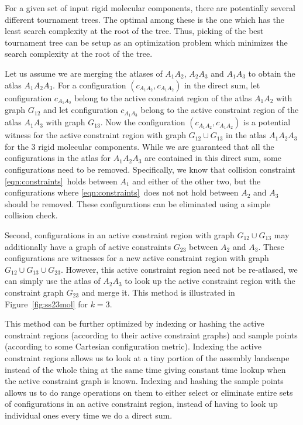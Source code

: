 \documentclass[]{article}
\newcommand{\figref}[1]{Figure~\ref{#1}}
\newcommand{\rmc}{rigid molecular component}
\newcommand{\cone}{\ref{eqn:constraints}}
\begin{document}
For a given set of input \rmc s, there are  potentially several different 
tournament trees. The optimal among these is the one which has the least
search complexity at the root of the tree. Thus, picking of the best
tournament tree can be setup as an optimization problem which minimizes
the search complexity at the root of the tree.

Let us assume we are merging the atlases of $A_1A_2$, $A_2A_3$ and $A_1A_3$ to
obtain the atlas $A_1A_2A_3$.  For a configuration $(c_{A_1A_2}, c_{A_1A_2})$
in the direct sum, let configuration $c_{A_1A_2}$ belong to the active
constraint region of the atlas $A_1A_2$ with graph $G_{12}$ and let
configuration $c_{A_1A_3}$ belong to the active constraint region of the atlas
$A_1A_3$ with graph $G_{13}$. Now the configuration $(c_{A_1A_2}, c_{A_1A_2})$
is a potential witness for the active constraint region with graph $G_{12}\cup
G_{13}$ in the atlas $A_1A_2A_3$ for the 3 \rmc s. While we are guaranteed that
all the configurations in the atlas for $A_1A_2A_3$ are contained in this
direct sum, some configurations need to be removed.  Specifically, we know that
collision constraint \cone\ holds between $A_1$ and either of the other two,
but the configurations where \cone\ does not not hold between $A_2$ and $A_3$
should be removed. These configurations can be eliminated using a simple
collision check.

Second, configurations in an active constraint region with graph $G_{12} \cup
G_{13}$ may additionally have a graph of active constraints $G_{23}$ between
$A_2$ and $A_3$. These configurations are witnesses for a new active constraint
region with graph $G_{12} \cup G_{13} \cup G_{23}$. However, this active constraint
region need not be re-atlased, we can simply use the atlas of $A_2A_3$ to look up
the active constraint region with the constraint graph $G_{23}$ and merge it.
This method is illustrated in \figref{fig:ss23mol} for $k=3$.

This method can be further optimized by indexing or hashing the active constraint regions
(according to their active constraint graphs) and sample points (according to
some Cartesian configuration metric). Indexing the active constraint regions
allows us to look at a tiny portion of the assembly landscape instead of the
whole thing at the same time giving constant time lookup when the active
constraint graph is known.  Indexing and hashing the sample points allows us to do range
operations on them to either select or eliminate entire sets of configurations
in an active constraint region, instead of having to look up individual ones
every time we do a direct sum.
\end{document}
